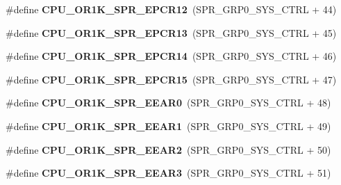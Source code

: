 \begin{DoxyCompactItemize}
\item 
\mbox{\label{or1k-utility_8h_a77d76d4d9e99657f1257d08c890b8811}} 
\#define {\bfseries C\+P\+U\+\_\+\+O\+R1\+K\+\_\+\+S\+P\+R\+\_\+\+E\+P\+C\+R12}~(S\+P\+R\+\_\+\+G\+R\+P0\+\_\+\+S\+Y\+S\+\_\+\+C\+T\+RL + 44)
\item 
\mbox{\label{or1k-utility_8h_a9508fd5701d30f75d0fca681833ce6d5}} 
\#define {\bfseries C\+P\+U\+\_\+\+O\+R1\+K\+\_\+\+S\+P\+R\+\_\+\+E\+P\+C\+R13}~(S\+P\+R\+\_\+\+G\+R\+P0\+\_\+\+S\+Y\+S\+\_\+\+C\+T\+RL + 45)
\item 
\mbox{\label{or1k-utility_8h_ab3c55d76d79fd6a4126385b54726c8ac}} 
\#define {\bfseries C\+P\+U\+\_\+\+O\+R1\+K\+\_\+\+S\+P\+R\+\_\+\+E\+P\+C\+R14}~(S\+P\+R\+\_\+\+G\+R\+P0\+\_\+\+S\+Y\+S\+\_\+\+C\+T\+RL + 46)
\item 
\mbox{\label{or1k-utility_8h_a3d5ece965378d156e76f690f92124bb7}} 
\#define {\bfseries C\+P\+U\+\_\+\+O\+R1\+K\+\_\+\+S\+P\+R\+\_\+\+E\+P\+C\+R15}~(S\+P\+R\+\_\+\+G\+R\+P0\+\_\+\+S\+Y\+S\+\_\+\+C\+T\+RL + 47)
\item 
\mbox{\label{or1k-utility_8h_ae49676b5dc223a1c797c6b6b267b42a9}} 
\#define {\bfseries C\+P\+U\+\_\+\+O\+R1\+K\+\_\+\+S\+P\+R\+\_\+\+E\+E\+A\+R0}~(S\+P\+R\+\_\+\+G\+R\+P0\+\_\+\+S\+Y\+S\+\_\+\+C\+T\+RL + 48)
\item 
\mbox{\label{or1k-utility_8h_a2bda7523f3b3a8621e06499452947539}} 
\#define {\bfseries C\+P\+U\+\_\+\+O\+R1\+K\+\_\+\+S\+P\+R\+\_\+\+E\+E\+A\+R1}~(S\+P\+R\+\_\+\+G\+R\+P0\+\_\+\+S\+Y\+S\+\_\+\+C\+T\+RL + 49)
\item 
\mbox{\label{or1k-utility_8h_a6093217a7b630f121fc722d31b45dea2}} 
\#define {\bfseries C\+P\+U\+\_\+\+O\+R1\+K\+\_\+\+S\+P\+R\+\_\+\+E\+E\+A\+R2}~(S\+P\+R\+\_\+\+G\+R\+P0\+\_\+\+S\+Y\+S\+\_\+\+C\+T\+RL + 50)
\item 
\mbox{\label{or1k-utility_8h_a65ff4164d0280e518c53f97a93c5e121}} 
\#define {\bfseries C\+P\+U\+\_\+\+O\+R1\+K\+\_\+\+S\+P\+R\+\_\+\+E\+E\+A\+R3}~(S\+P\+R\+\_\+\+G\+R\+P0\+\_\+\+S\+Y\+S\+\_\+\+C\+T\+RL + 51)
\item 
\mbox{\label{or1k-utility_8h_ad774c757b96e0db37ee239b97b6dc308}} 

\end{DoxyCompactItemize}
